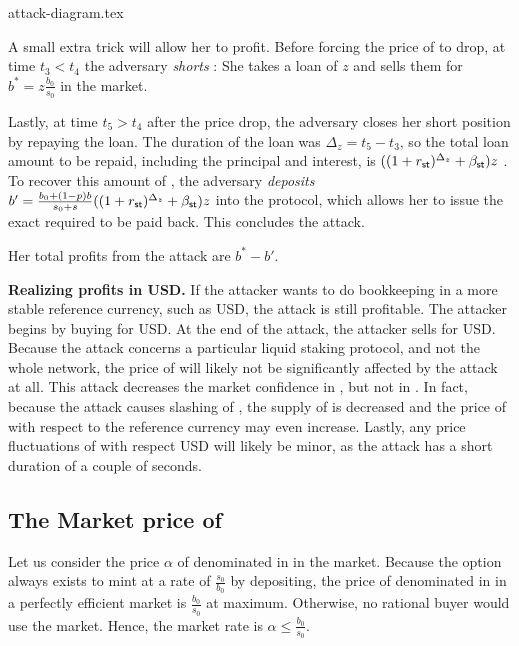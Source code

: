 {attack-diagram.tex}

A small extra trick will allow her to profit.
Before forcing the price of \stasset to drop, at time $t_3 < t_4$
the adversary \emph{shorts}
\stasset: She takes a loan of $z$ \stassets and
sells
them for $b^* = z \frac{b_0}{s_0}$ \asset in the market.

Lastly, at time $t_5 > t_4$ after the price drop, the adversary closes her short position by repaying the
\stasset loan. The duration of the loan was $\Delta_z = t_5 - t_3$, so the
total loan amount to be repaid, including the principal and interest, is
$((1 + r_{\textsf{st}})^{\Delta_z} + \beta_{\textsf{st}}) z$ \stasset.
To recover this amount of \stasset, the adversary \emph{deposits}
$b' = \frac{b_0 + (1 - p) b}{s_0 + s} ((1 + r_{\textsf{st}})^{\Delta_z} + \beta_{\textsf{st}}) z$ \asset
into the protocol, which allows her to issue the exact required \stasset
to be paid back. This concludes the attack.

Her total profits from the attack are $b^* - b'$.

\noindent
\textbf{Realizing profits in USD.}
If the attacker wants to do bookkeeping in a more stable reference currency,
such as USD, the attack is still profitable. The attacker begins by buying
\asset for USD. At the end of the attack, the attacker sells \asset for USD.
Because the attack concerns a particular liquid staking protocol, and
not the whole \asset network, the price of \asset will likely not
be significantly affected by the attack at all.
This attack decreases the market confidence in \stasset,
but not in \asset.
In fact, because
the attack causes slashing of \asset, the supply of \asset is decreased
and the price of \asset with respect to the reference currency may
even increase.
Lastly, any price fluctuations of \asset with respect USD will likely be
minor, as the attack has a short duration of a couple of seconds.



\subsection{The Market price of \stasset}\label{sec:stasset-price}

Let us consider the price $\alpha$ of \stasset denominated in \asset in the market.
Because the option always exists to mint at a rate of $\frac{s_0}{b_0}$ by
depositing, the price of \stasset denominated in \asset in a perfectly
efficient market is $\frac{b_0}{s_0}$ at maximum. Otherwise, no
rational buyer would use the market. Hence, the market rate is
$\alpha \leq \frac{b_0}{s_0}$.

